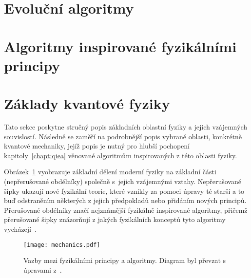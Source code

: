 \section{Evoluční algoritmy}

\section{Algoritmy inspirované fyzikálními principy}

\section{Základy kvantové fyziky}
Tato sekce poskytne stručný popis základních oblastní fyziky a jejich vzájemných souvislostí. 
Následně se zaměří na podrobnější popis vybrané oblasti, konkrétně kvantové mechaniky, jejíž popis je nutný pro hlubší pochopení kapitoly~\ref{chapt:qiea} věnované algoritmům inspirovaných z této oblasti fyziky.

Obrázek~\ref{fig:mechanics} vyobrazuje základní dělení moderní fyziky na základní části (nepřerušované obdélníky) společně s~jejich vzájemnými vztahy. 
Nepřerušované šipky ukazují nové fyzikální teorie, které vznikly za pomoci úpravy té starší a to buď odstraněním některých z jejich předpokladů nebo přidáním nových principů.
Přerušované obdélníky značí nejznámější fyzikálně inspirované algoritmy, přičemž přerušované šipky znázorňují z jakých fyzikálních konceptů tyto algoritmy vycházejí~\cite{NaturalComputing}.

\begin{figure}[ht!]
    \centering
    \texttt{[image: mechanics.pdf]}
    \caption{Vazby mezi fyzikálními principy a algoritmy. Diagram byl převzat s úpravami z~\cite{NaturalComputing}.}
    \label{fig:mechanics}
\end{figure}

